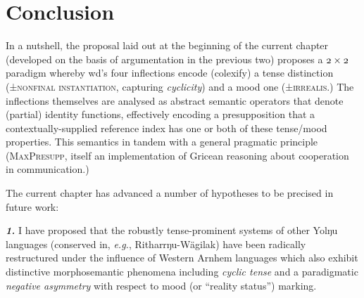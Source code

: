%	
%
\section{Conclusion}


In a nutshell, the proposal laid out at the beginning of the current chapter (developed on the basis of argumentation in the previous two) proposes a $\mathnormal{ 2\times 2 }$ paradigm whereby \gls{wd}'s four inflections encode (colexify) a tense distinction (\textsc{±nonfinal instantiation}, capturing \textit{cyclicity}) and a mood one (\textsc{±irrealis}.) The inflections themselves are analysed as abstract semantic operators that denote (partial) identity functions, effectively encoding a presupposition that a contextually-supplied reference index has one or both of these tense/mood properties. This semantics in tandem with a general pragmatic principle (\textsc{MaxPresupp}, itself an implementation of Gricean reasoning about cooperation in communication.)

The current chapter has advanced a number of hypotheses to be precised in future work:

 \textbf{\textit{1.}} I have proposed that the robustly tense-prominent systems of other Yolŋu languages (conserved in, \textit{e.g.}, Ritharrŋu-Wägilak) have been radically restructured under the influence of Western Arnhem languages which also exhibit distinctive morphosemantic phenomena including \textit{cyclic tense} and a paradigmatic \textit{negative asymmetry} with respect to mood (or ``reality status'') marking.
 
